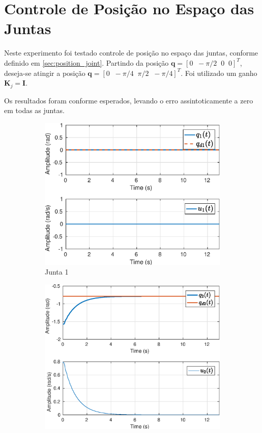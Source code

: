 	

\section{Controle de Posição no Espaço das Juntas}

Neste experimento foi testado controle de posição no espaço das juntas, conforme definido em \ref{sec:position_joint}. Partindo da posição $\bm{q} =[ 0 \;\; -\pi/2 \;\; 0 \;\; 0]^T$, deseja-se atingir a posição $\bm{q} =[ 0 \;\; -\pi/4 \;\; \pi/2  \;\; -\pi/4]^T$. Foi utilizado um ganho $\bm{K}_j = \bm{I}$.

Os resultados foram conforme esperados, levando o erro assintoticamente a zero em todas as juntas.

\begin{figure}[H]
\centering
\begin{subfigure}{.5\textwidth}
  \centering
  \includegraphics[width=\linewidth]{./img/joint_test1/q1.eps}
  \caption{Junta 1}
  \label{fig:sub1}
\end{subfigure}%
\begin{subfigure}{.5\textwidth}
  \centering
  \includegraphics[width=\linewidth]{./img/joint_test1/q2.eps}

\end{subfigure}
\end{figure}
